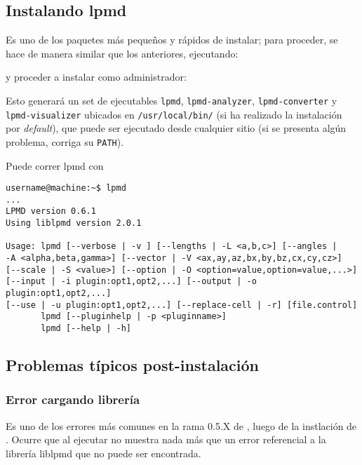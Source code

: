 \subsection{Instalando lpmd}

Es uno de los paquetes m\'as peque\~nos y r\'apidos de instalar; para proceder, se hace de manera similar que los anteriores, ejecutando:


y proceder a instalar como administrador:


Esto generar\'a un set de ejecutables \verb|lpmd|, \verb|lpmd-analyzer|, \verb|lpmd-converter| y \verb|lpmd-visualizer| ubicados en \verb|/usr/local/bin/| (si ha realizado la instalaci\'on por \textit{default}), que puede ser ejecutado desde cualquier sitio (si se presenta alg\'un problema, corriga su \verb|PATH|).

Puede correr lpmd con

\begin{verbatim}
username@machine:~$ lpmd
...
LPMD version 0.6.1
Using liblpmd version 2.0.1

Usage: lpmd [--verbose | -v ] [--lengths | -L <a,b,c>] [--angles | 
-A <alpha,beta,gamma>] [--vector | -V <ax,ay,az,bx,by,bz,cx,cy,cz>] 
[--scale | -S <value>] [--option | -O <option=value,option=value,...>] 
[--input | -i plugin:opt1,opt2,...] [--output | -o plugin:opt1,opt2,...] 
[--use | -u plugin:opt1,opt2,...] [--replace-cell | -r] [file.control]
       lpmd [--pluginhelp | -p <pluginname>]
       lpmd [--help | -h]
\end{verbatim}

\subsection{Problemas t\'ipicos post-instalaci\'on}

\subsubsection{Error cargando librer\'ia}

Es uno de los errores m\'as comunes en la rama 0.5.X de {\lpmd}, luego de la instlaci\'on de {\lpmd}. Ocurre que al ejecutar {\lpmd} no muestra nada m\'as que un error referencial a la librer\'ia liblpmd que no puede ser encontrada.

